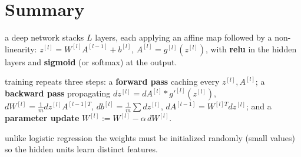 \documentclass[4apaper,12pt]{book}
\begin{document}
\section{Summary}
\begin{description}
\item a deep network stacks $L$ layers, each applying an affine map followed by a non-linearity: $z^{[l]}=W^{[l]}A^{[l-1]}+b^{[l]}$, $A^{[l]}=g^{[l]}(z^{[l]})$, with \textbf{relu} in the hidden layers and \textbf{sigmoid} (or softmax) at the output.
\item training repeats three steps: a \textbf{forward pass} caching every $z^{[l]},A^{[l]}$; a \textbf{backward pass} propagating $dz^{[l]}=dA^{[l]}*g'^{[l]}(z^{[l]})$, $dW^{[l]}=\frac{1}{m}dz^{[l]}A^{[l-1]T}$, $db^{[l]}=\frac{1}{m}\sum dz^{[l]}$, $dA^{[l-1]}=W^{[l]T}dz^{[l]}$; and a \textbf{parameter update} $W^{[l]}\!:=\!W^{[l]}-\alpha\,dW^{[l]}$.
\item unlike logistic regression the weights must be initialized randomly (small values) so the hidden units learn distinct features.
\end{description}
\end{document}

